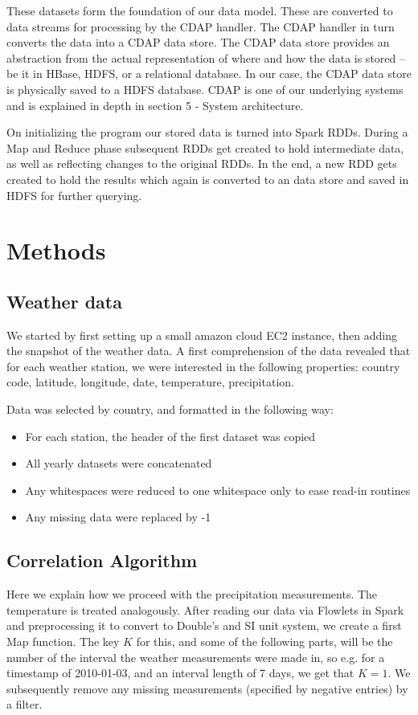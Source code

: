 \documentclass[
10pt, %
a4paper, %
oneside, %
headinclude,footinclude, %
useAMS,
usenatbib
]{template/mn2e}  %
\begin{document}
These datasets form the foundation of our data model. These are converted to data streams for processing by the CDAP handler. The CDAP handler in turn converts the data into a CDAP data store. The CDAP data store provides an abstraction from the actual representation of where and how the data is stored – be it in HBase, HDFS, or a relational database. In our case, the CDAP data store is physically saved to a HDFS database. CDAP is one of our underlying systems and is explained in depth in section 5 - System architecture.

On initializing the program our stored data is turned into Spark RDDs. During a Map and Reduce phase subsequent RDDs get created to hold intermediate data, as well as reflecting changes to the original RDDs. In the end, a new RDD gets created to hold the results which again is converted to an data store and saved in HDFS for further querying.


\section{Methods}
\subsection{Weather data}
We started by first setting up a small amazon cloud EC2 instance, then adding the snapshot of the weather data. A first comprehension of the data revealed that for each weather station, we were interested in the following properties: country code, latitude, longitude, date, temperature, precipitation.

Data was selected by country, and formatted in the following way:

\begin{itemize}
    \item For each station, the header of the first dataset was copied
    \item All yearly datasets were concatenated
    \item Any whitespaces were reduced to one whitespace only to ease read-in routines
    \item Any missing data were replaced by -1
\end{itemize}


\subsection{Correlation Algorithm}
\label{sec:cor}
Here we explain how we proceed with the precipitation measurements. The temperature is treated analogously.  After reading our data via Flowlets in Spark and preprocessing it to convert to Double’s and SI unit system, we create a first Map function. The key $K$ for this, and some of the following parts, will be the number of the interval the weather measurements were made in, so e.g. for a timestamp of 2010-01-03, and an interval length of 7 days, we get that $K=1$. We subsequently remove any missing measurements (specified by negative entries) by a filter.
\end{document}
